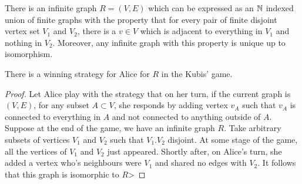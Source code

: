 \begin{theorem}
    There is an infinite graph $R=(V,E)$ which can be expressed as an $\mathbb{N}$ indexed union of finite graphs with the property that for every pair of finite disjoint vertex set $V_1$ and $V_2$, 
    there is a $v \in V$ which is adjacent to everything in $V_1$ and nothing in $V_2$. 
    Moreover, any infinite graph with this property is unique up to isomorphism.
\end{theorem}


\begin{theorem}
    There is a winning strategy for Alice for $R$ in the Kubis' game.
\end{theorem}
\begin{proof}
    Let Alice play with the strategy that on her turn, if the current graph is $(V,E)$, for any subset $A \subset V$, 
    she responds by adding vertex $v_A$ such that $v_A$ is connected to everything in $A$ and not connected to anything outside of $A$. 
    Suppose at the end of the game, we have an infinite graph $R$. 
    Take arbitrary subsets of vertices $V_1$ and $V_2$ such that $V_1.V_2$ disjoint. 
    At some stage of the game, all the vertices of $V_1$ and $V_2$ just appeared. 
    Shortly after, on Alice's turn, she added a vertex who's neighbours were $V_1$ and shared no edges with $V_2$. 
    It follows that this graph is isomorphic to $R$>
\end{proof}